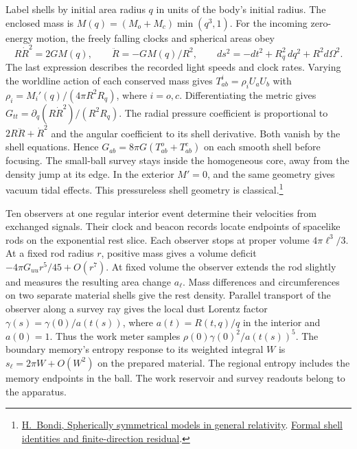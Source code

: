 \documentclass[11pt]{article}
\begin{document}
Label shells by initial area radius $q$ in units of the body's initial
radius. The enclosed mass is $M(q)=(M_o+M_c)\min(q^3,1)$.
For the incoming zero-energy motion, the freely falling clocks and
spherical areas obey
\[
 R\dot R^2=2GM(q),\qquad \ddot R=-GM(q)/R^2,\qquad
 ds^2=-dt^2+R_q^2\,dq^2+R^2d\Omega^2 .
\]
The last expression describes the recorded light speeds and clock rates.
Varying the worldline action of each conserved mass gives
$T^i_{ab}=\rho_i U_aU_b$ with $\rho_i=M_i'(q)/(4\pi R^2R_q)$,
where $i=o,c$. Differentiating the metric gives
$G_{tt}=\partial_q(R\dot R^2)/(R^2R_q)$. The radial pressure coefficient
is proportional to $2R\ddot R+\dot R^2$ and the angular coefficient to
its shell derivative. Both vanish by the shell equations. Hence
$G_{ab}=8\pi G(T^o_{ab}+T^c_{ab})$ on each smooth shell before focusing. The
small-ball survey stays inside the homogeneous core, away from the
density jump at its edge. In the exterior $M'=0$, and the same geometry
gives vacuum tidal effects.
This pressureless shell geometry is classical.\footnote{
\href{https://doi.org/10.1093/mnras/107.5-6.410}{H.~Bondi, Spherically symmetrical models in general relativity}.
\href{https://github.com/FloatingPragma/observer-patch-holography/blob/main/Lean/ObserverPatchHolography/EinsteinBranch/SphericalDust.lean}{Formal shell identities and finite-direction residual}.}

Ten observers at one regular interior event determine their velocities
from exchanged signals. Their clock and beacon records locate
endpoints of spacelike rods on the exponential rest slice. Each
observer stops at proper volume $4\pi\ell^3/3$. At a fixed rod radius
$r$, positive mass gives a volume deficit
$-4\pi G_{uu}r^5/45+O(r^7)$. At fixed volume the observer extends the
rod slightly and measures the resulting area change $a_\ell$.
Mass differences and circumferences on two separate material shells
give the rest density. Parallel transport of the observer along a
survey ray gives the local dust Lorentz factor $\gamma(s)=\gamma(0)/a(t(s))$,
where $a(t)=R(t,q)/q$ in the interior and $a(0)=1$. Thus the work
meter samples $\rho(0)\gamma(0)^2/a(t(s))^5$. The boundary memory's
entropy response to its weighted integral $W$ is
$s_\ell=2\pi W+O(W^2)$ on the prepared material. The regional entropy
includes the memory endpoints in the ball. The work reservoir and
survey readouts belong to the apparatus.
\end{document}
